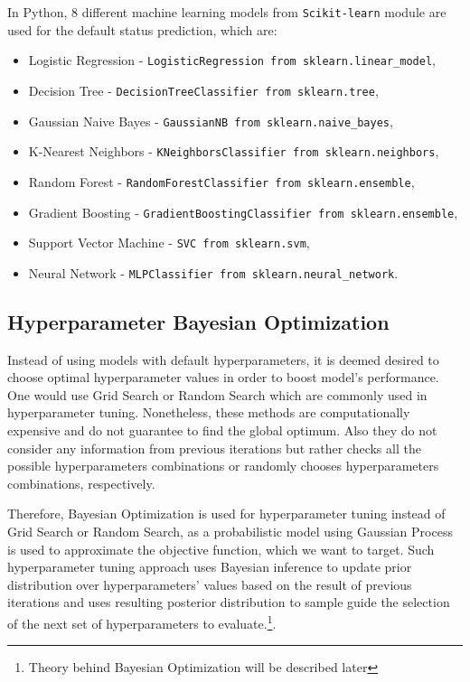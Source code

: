 In Python, 8 different machine learning models from \lstinline{Scikit-learn} module are used for the default status prediction, which are:
\begin{itemize}\setlength\itemsep{0em}
    \item Logistic Regression - \lstinline{LogisticRegression from sklearn.linear_model},
    \item Decision Tree - \lstinline{DecisionTreeClassifier from sklearn.tree},
    \item Gaussian Naive Bayes - \lstinline{GaussianNB from sklearn.naive_bayes},
    \item K-Nearest Neighbors - \lstinline{KNeighborsClassifier from sklearn.neighbors},
    \item Random Forest - \lstinline{RandomForestClassifier from sklearn.ensemble},
    \item Gradient Boosting - \lstinline{GradientBoostingClassifier from sklearn.ensemble},
    \item Support Vector Machine - \lstinline{SVC from sklearn.svm},
    \item Neural Network - \lstinline{MLPClassifier from sklearn.neural_network}.
\end{itemize}

\subsection{Hyperparameter Bayesian Optimization}

Instead of using models with default hyperparameters, it is deemed desired to choose optimal hyperparameter values in order to boost model's performance.
One would use Grid Search or Random Search which are commonly used in hyperparameter tuning. Nonetheless, these methods are computationally expensive and do not guarantee to find the global optimum.
Also they do not consider any information from previous iterations but rather checks all the possible hyperparameters combinations or randomly chooses hyperparameters combinations, respectively.

Therefore, Bayesian Optimization is used for hyperparameter tuning instead of Grid Search or Random Search, as a probabilistic model using Gaussian Process is used to approximate the objective function, which we want to target.
Such hyperparameter tuning approach uses Bayesian inference to update prior distribution over hyperparameters' values based on the result of previous iterations and uses resulting posterior distribution to sample guide the selection of the next set of hyperparameters to evaluate.\footnote{Theory behind Bayesian Optimization will be described later}.

